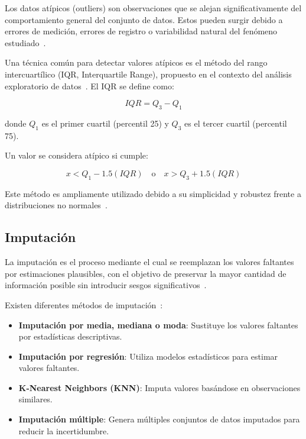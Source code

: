 \documentclass[12pt]{article}
\begin{document}
Los datos atípicos (outliers) son observaciones que se alejan significativamente del comportamiento general del conjunto de datos. Estos pueden surgir debido a errores de medición, errores de registro o variabilidad natural del fenómeno estudiado~\cite{tukey1977exploratory}.

Una técnica común para detectar valores atípicos es el método del rango intercuartílico (IQR, Interquartile Range), propuesto en el contexto del análisis exploratorio de datos~\cite{tukey1977exploratory}. El IQR se define como:

\begin{equation}
IQR = Q_3 - Q_1
\end{equation}

donde $Q_1$ es el primer cuartil (percentil 25) y $Q_3$ es el tercer cuartil (percentil 75).

Un valor se considera atípico si cumple:

\begin{equation}
x < Q_1 - 1.5(IQR) \quad \text{o} \quad x > Q_3 + 1.5(IQR)
\end{equation}

Este método es ampliamente utilizado debido a su simplicidad y robustez frente a distribuciones no normales~\cite{han2011data}.
\subsection{Imputación}

La imputación es el proceso mediante el cual se reemplazan los valores faltantes por estimaciones plausibles, con el objetivo de preservar la mayor cantidad de información posible sin introducir sesgos significativos~\cite{little2019missing}.

Existen diferentes métodos de imputación~\cite{hastie2009elements, james2021introduction}:

\begin{itemize}
    \item \textbf{Imputación por media, mediana o moda}: Sustituye los valores faltantes por estadísticas descriptivas.
    \item \textbf{Imputación por regresión}: Utiliza modelos estadísticos para estimar valores faltantes.
    \item \textbf{K-Nearest Neighbors (KNN)}: Imputa valores basándose en observaciones similares.
    \item \textbf{Imputación múltiple}: Genera múltiples conjuntos de datos imputados para reducir la incertidumbre.
\end{itemize}
\end{document}
